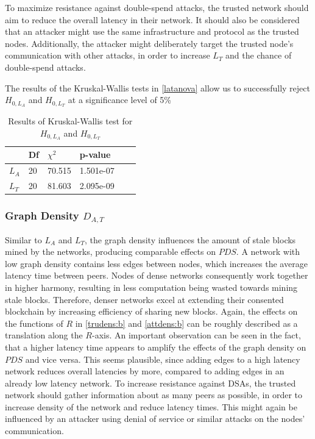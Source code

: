 \documentclass[a4paper,12pt,twoside]{report}
\begin{document}
To maximize resistance against double-spend attacks, the trusted network should aim to reduce the overall latency in their network. It should also be considered that an attacker might use the same infrastructure and protocol as the trusted nodes. Additionally, the attacker might deliberately target the trusted node's communication with other attacks, in order to increase $L_{T}$ and the chance of double-spend attacks.

The results of the Kruskal-Wallis tests in \autoref{latanova} allow us to successfully reject $H_{0,L_A}$ and $H_{0,L_T}$ at a significance level of 5\%
\begin{table}[hb]
\centering
\begin{tabular}{|l|l|l|l|l|l|} \hline
& Df & $\chi^{2}$ & p-value \\ \hline
$L_A$ & 20 &  70.515 & 1.501e-07 \\ \hline
$L_T$ & 20 &  81.603 & 2.095e-09 \\ \hline
\end{tabular}
\caption{Results of Kruskal-Wallis test for $H_{0,L_A}$ and $H_{0,L_T}$}
\label{latanova}
\end{table}

\subsubsection{Graph Density $D_{A,T}$}
Similar to $L_{A}$ and $L_{T}$, the graph density influences the amount of stale blocks mined by the networks, producing comparable effects on $PDS$. A network with low graph density contains less edges between nodes, which increases the average latency time between peers. Nodes of dense networks consequently work together in higher harmony, resulting in less computation being wasted towards mining stale blocks. Therefore, denser networks excel at extending their consented blockchain by increasing efficiency of sharing new blocks. Again, the effects on the functions of $R$ in \autoref{trudens:b} and \autoref{attdens:b} can be roughly described as a translation along the $R$-axis. An important observation can be seen in the fact, that a higher latency time appears to amplify the effects of the graph density on $PDS$ and vice versa. This seems plausible, since adding edges to a high latency network reduces overall latencies by more, compared to adding edges in an already low latency network. To increase resistance against DSAs, the trusted network should gather information about as many peers as possible, in order to increase density of the network and reduce latency times. This might again be influenced by an attacker using denial of service or similar attacks on the nodes' communication.
\end{document}
